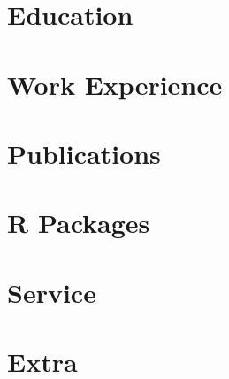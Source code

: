 \documentclass[letterpaper, 10.5pt, sans]{moderncv}
\begin{document}
\makecvtitle

\vspace*{-35pt}

\section{Education}







\vspace{-10pt}
\section{Work Experience}


\vspace{-10pt}
\vspace{-5pt}










\vspace{-5pt}


\section{Publications}







\newpage


\section{R Packages}













\section{Service}








\vspace{-5pt}
\section{Extra}

\vspace{-5pt}


\end{document}
